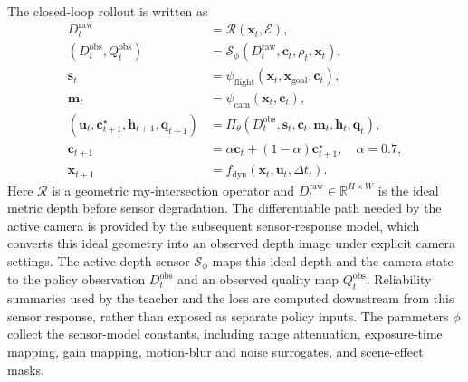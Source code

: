 \documentclass[letterpaper,journal]{IEEEtran}
\begin{document}
The closed-loop rollout is written as
\begin{align}
    D_t^{\mathrm{raw}} &=
    \mathcal{R}(\mathbf{x}_t,\mathcal{E}), \label{eq:raw_depth}\\
    (D_t^{\mathrm{obs}},Q_t^{\mathrm{obs}}) &=
    \mathcal{S}_{\phi}(D_t^{\mathrm{raw}},\mathbf{c}_t,\rho_t,\mathbf{x}_t),
    \label{eq:sensor}\\
    \mathbf{s}_t &=
    \psi_{\mathrm{flight}}(\mathbf{x}_t,\mathbf{x}_{\mathrm{goal}},
    \mathbf{c}_t), \label{eq:state}\\
    \mathbf{m}_t &=
    \psi_{\mathrm{cam}}(\mathbf{x}_t,\mathbf{c}_t), \label{eq:cam_motion}\\
    (\mathbf{u}_t,\mathbf{c}_{t+1}^{\star},\mathbf{h}_{t+1},\mathbf{q}_{t+1})
    &= \Pi_\theta(D_t^{\mathrm{obs}},\mathbf{s}_t,\mathbf{c}_t,
    \mathbf{m}_t,\mathbf{h}_t,\mathbf{q}_t), \label{eq:policy}\\
    \mathbf{c}_{t+1}
    &= \alpha\mathbf{c}_t+(1-\alpha)\mathbf{c}_{t+1}^{\star},
    \quad \alpha=0.7, \label{eq:camera_ema}\\
    \mathbf{x}_{t+1}
    &= f_{\mathrm{dyn}}(\mathbf{x}_t,\mathbf{u}_t,\Delta t_t).
    \label{eq:dynamics}
\end{align}
Here $\mathcal{R}$ is a geometric ray-intersection operator and
$D_t^{\mathrm{raw}}\in\mathbb{R}^{H\times W}$ is the ideal metric depth before
sensor degradation. The differentiable path needed by the active camera is
provided by the subsequent sensor-response model, which converts this ideal
geometry into an observed depth image under explicit camera settings. The
active-depth sensor
$\mathcal{S}_{\phi}$ maps this ideal depth and the camera state to the policy
observation $D_t^{\mathrm{obs}}$ and an observed quality map
$Q_t^{\mathrm{obs}}$. Reliability summaries used by the teacher and the loss are
computed downstream from this sensor response, rather than exposed as separate
policy inputs. The parameters $\phi$ collect the sensor-model constants,
including range attenuation, exposure-time mapping, gain mapping,
motion-blur and noise surrogates, and scene-effect masks.
\end{document}
